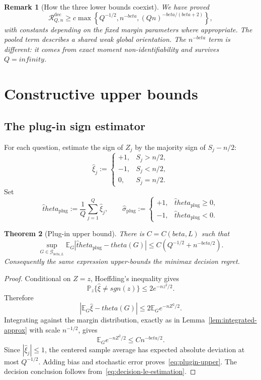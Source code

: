 \documentclass[11pt]{article}
\def\beta{beta}%
\def\theta{theta}%
\def\sgn{sgn}%
\def\infty{infinity}%
\newtheorem{theorem}{Theorem}[section]
\newtheorem{remark}[theorem]{Remark}
\newcommand{\Pp}{\mathbb P}
\newcommand{\E}{\mathbb E}
\newcommand{\sgn}{\operatorname{sgn}}
\newcommand{\calG}{\mathcal G}
\newcommand{\calR}{\mathcal R}
\begin{document}
\begin{remark}[How the three lower bounds coexist]
We have proved
\begin{equation}
\label{eq:combined-lower}
\calR^{\mathrm{dec}}_{Q,n}
\ge
c\max\left\{
Q^{-1/2},
 n^{-\beta},
 (Qn)^{-\beta/(\beta+2)}
\right\},
\end{equation}
with constants depending on the fixed margin parameters where appropriate.  The pooled term describes a shared weak global orientation.  The $n^{-\beta}$ term is different: it comes from exact moment non-identifiability and survives $Q=\infty$.
\end{remark}

\section{Constructive upper bounds}

\subsection{The plug-in sign estimator}

For each question, estimate the sign of $Z_j$ by the majority sign of $S_j-n/2$:
\[
\widehat\xi_j
:=
\begin{cases}
+1,&S_j>n/2,\\
-1,&S_j<n/2,\\
0,&S_j=n/2.
\end{cases}
\]
Set
\[
\widehat\theta_{\mathrm{plug}}
:=\frac1Q\sum_{j=1}^Q\widehat\xi_j,
\qquad
\widehat\sigma_{\mathrm{plug}}
:=
\begin{cases}
+1,&\widehat\theta_{\mathrm{plug}}\ge0,\\
-1,&\widehat\theta_{\mathrm{plug}}<0.
\end{cases}
\]

\begin{theorem}[Plug-in upper bound]
\label{thm:plugin-upper}
There is $C=C(\beta,L)$ such that
\begin{equation}
\label{eq:plugin-upper}
\sup_{G\in\calG_{\beta,L}}
\E_G|\widehat\theta_{\mathrm{plug}}-\theta(G)|
\le
C\left(Q^{-1/2}+n^{-\beta/2}\right).
\end{equation}
Consequently the same expression upper-bounds the minimax decision regret.
\end{theorem}

\begin{proof}
Conditional on $Z=z$, Hoeffding's inequality gives
\[
\Pp_z\{\widehat\xi\ne\sgn(z)\}
\le2e^{-nz^2/2}.
\]
Therefore
\[
|\E_G\widehat\xi-\theta(G)|
\le2\E_G e^{-nZ^2/2}.
\]
Integrating against the margin distribution, exactly as in Lemma~\ref{lem:integrated-approx} with scale $n^{-1/2}$, gives
\[
\E_G e^{-nZ^2/2}
\le Cn^{-\beta/2}.
\]
Since $|\widehat\xi_j|\le1$, the centered sample average has expected absolute deviation at most $Q^{-1/2}$.  Adding bias and stochastic error proves~\eqref{eq:plugin-upper}.  The decision conclusion follows from~\eqref{eq:decision-le-estimation}.
\end{proof}
\end{document}
